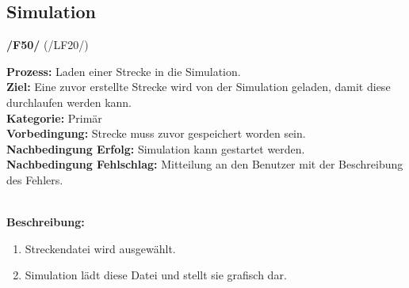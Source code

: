 \documentclass[11pt,a4paper]{article}
\begin{document}
	\subsection{Simulation}
	\noindent\large\textbf{/F50/} (/LF20/)
	\normalsize\\
	\begin{addmargin}{0.1 \textwidth}
		\textbf{Prozess:} Laden einer Strecke in die Simulation.\\
		\textbf{Ziel:} Eine zuvor erstellte Strecke wird von der Simulation geladen, damit diese durchlaufen werden kann.\\
		\textbf{Kategorie:} Primär\\
		\textbf{Vorbedingung:} Strecke muss zuvor gespeichert worden sein.\\
		\textbf{Nachbedingung Erfolg:} Simulation kann gestartet werden.\\
		\textbf{Nachbedingung Fehlschlag:} Mitteilung an den Benutzer mit der Beschreibung des Fehlers.\\
		\\
		\begin{minipage}{\textwidth}
			\textbf{Beschreibung:}
			\begin{enumerate}
				\item Streckendatei wird ausgewählt.
				\item Simulation lädt diese Datei und stellt sie grafisch dar.\\
			\end{enumerate}
		\end{minipage}
	\end{addmargin}
\end{document}
